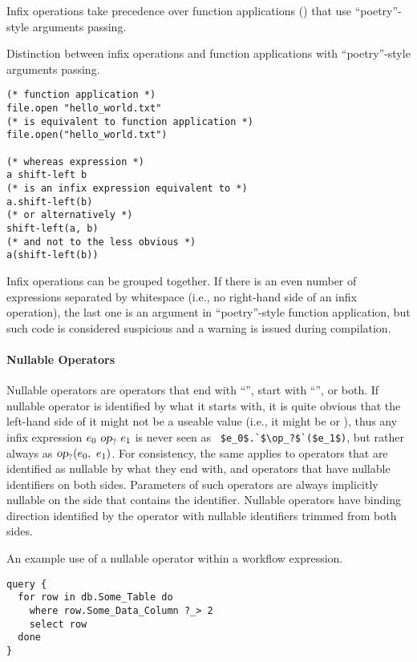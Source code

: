 Infix operations take precedence over function applications () that use ``poetry''-style arguments passing.

\example Distinction between infix operations and function applications with ``poetry''-style arguments passing. 
\begin{lstlisting}
(* function application *)
file.open "hello_world.txt"
(* is equivalent to function application *)
file.open("hello_world.txt")

(* whereas expression *)
a shift-left b
(* is an infix expression equivalent to *)
a.shift-left(b)
(* or alternatively *)
shift-left(a, b)
(* and not to the less obvious *)
a(shift-left(b))
\end{lstlisting}

Infix operations can be grouped together. If there is an even number of expressions separated by whitespace (i.e., no right-hand side of an infix operation), the last one is an argument in ``poetry''-style function application, but such code is considered suspicious and a warning is issued during compilation. 




\paragraph{Nullable Operators}

Nullable operators are operators that end with ``'', start with ``'', or both. If nullable operator is identified by what it starts with, it is quite obvious that the left-hand side of it might not be a useable value (i.e., it might be  or ), thus any infix expression $e_0\ \mbox{\sl op}_?\ e_1$ is never seen as ~\lstinline!$e_0$.`$\op_?$`($e_1$)!, but rather always as $\mbox{\sl op}_?(e_0,\ e_1)$. For consistency, the same applies to operators that are identified as nullable by what they end with, and operators that have nullable identifiers on both sides. Parameters of such operators are always implicitly nullable on the side that contains the identifier. Nullable operators have binding direction identified by the operator with nullable identifiers trimmed from both sides. 

\example An example use of a nullable operator within a workflow expression.
\begin{lstlisting}
query {
  for row in db.Some_Table do
    where row.Some_Data_Column ?_> 2
    select row
  done
} 
\end{lstlisting}





